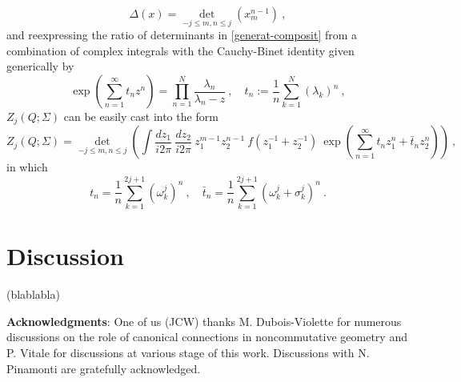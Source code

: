 \documentclass[a4paper,11pt,twoside]{article}
\numberwithin{equation}{section}
\theoremstyle{nonumberplain}
\newcounter{and}
\begin{document}
%
\begin{equation}
\Delta(x)=\det_{-j\le m,n\le j}\left(x_m^{n-1}\right) \ ,
\end{equation}
%
and reexpressing the ratio of determinants in \eqref{generat-composit} from a combination of complex integrals with the Cauchy-Binet identity given generically by%
%
\begin{equation}
\exp\left(\sum_{n=1}^\infty t_nz^n\right) = \prod_{n=1}^{N}\frac{\lambda_n}{\lambda_n-z} \ , \quad t_n:=\frac{1}{n}\sum_{k=1}^{N}(\lambda_k)^n \ ,
\end{equation}
%
$Z_j(Q;\Sigma)$ can be easily cast into the form%
%
\begin{equation}
Z_j(Q;\Sigma) = \det_{-j\le m,n\le j} \left(\int \frac{dz_1}{i2\pi} \ \frac{dz_2}{i2\pi} \ z_1^{m-1} z_2^{n-1} \ f\left(z_1^{-1}+z_2^{-1}\right) \ \exp\left(\sum_{n=1}^\infty t_nz_1^n+ \bar{t}_nz_2^n\right) \right) \ , \label{tau-toda}
\end{equation}
%
in which%
%
\begin{equation}
t_n = \frac{1}{n} \sum_{k=1}^{2j+1} (\omega^j_k)^n \ , \quad \bar{t}_n=\frac{1}{n}\sum_{k=1}^{2j+1}(\omega^j_k+\sigma^j_k)^n \ . \label{time-variable} 
\end{equation}


\section{Discussion}

(blablabla)


\vspace*{40pt}\noindent\textbf{Acknowledgments}: One of us (JCW) thanks M. Dubois-Violette for numerous discussions on the role of canonical connections in noncommutative geometry and P. Vitale for discussions at various stage of this work. Discussions with N. Pinamonti are gratefully acknowledged. 




\small
\end{document}
